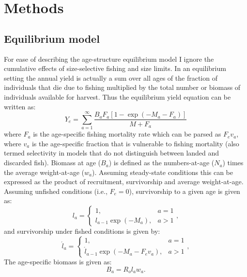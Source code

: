 \section*{Methods} %
\label{sec:methods}

\subsection*{Equilibrium model} %
\label{sub:equilibrium_model}

For ease of describing the age-structure equilibrium model I ignore the cumulative effects of size-selective fishing and size limits. In an equilibrium setting the annual yield is actually a sum over all ages of the fraction of individuals that die due to fishing multiplied by the total number or biomass of individuals available for harvest.  Thus the equilibrium yield equation can be written as:
\begin{equation}\label{eq:Y_e}
	Y_e = \sum_{a=1}^\infty \frac{B_a F_a [1-\exp(-M_a-F_a)]}{M+F_a}
\end{equation}
where $F_a$ is the age-specific fishing mortality rate which can be parsed as $F_e v_a$, where $v_a$ is the age-specific fraction that is vulnerable to fishing mortality (also termed selectivity in models that do not distinguish between landed and discarded fish).  Biomass at age ($B_a$) is defined as the numbers-at-age ($N_a$) times the average weight-at-age ($w_a$).  Assuming steady-state conditions this can be expressed as the product of recruitment, survivorship and average weight-at-age.  Assuming unfished conditions (i.e., $F_e=0$), survivorship to a given age is given as:
\begin{equation}\label{eq:unfished_survivorship}
	l_a =\begin{cases} 1, & a=1 \\ l_{a-1} \exp(-M_a), &a>1\end{cases}, 
\end{equation}
and survivorship under fished conditions is given by:
\begin{equation}\label{eq:fished_survivorship}
	\acute{l}_a =\begin{cases} 1, & a=1 \\ \acute{l}_{a-1} \exp(-M_a-F_e v_a), &a>1\end{cases}, 
\end{equation}
The age-specific biomass is given as:
\begin{equation} \label{eq:B_a}
	B_a = R_o l_a w_a.
\end{equation}

